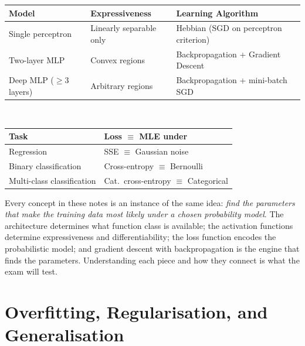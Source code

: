 \documentclass[11pt,a4paper]{article}
\begin{document}
\begin{tcolorbox}[colback=AlgoPurpleBg,colframe=AlgoPurple,boxrule=1pt,arc=4pt,
  title={\bfseries\color{white} ANN/DL Concepts Overview},
  attach boxed title to top left={yshift=-2mm,xshift=4mm},
  boxed title style={colback=AlgoPurple,rounded corners,boxrule=0pt}]
\begin{tabular}{@{}lll@{}}
\toprule
\textbf{Model} & \textbf{Expressiveness} & \textbf{Learning Algorithm} \\
\midrule
Single perceptron & Linearly separable only & Hebbian (SGD on perceptron criterion) \\
Two-layer MLP & Convex regions & Backpropagation + Gradient Descent \\
Deep MLP ($\geq 3$ layers) & Arbitrary regions & Backpropagation + mini-batch SGD \\
\bottomrule
\end{tabular}\\[8pt]
\begin{tabular}{@{}ll@{}}
\toprule
\textbf{Task} & \textbf{Loss $\equiv$ MLE under} \\
\midrule
Regression & SSE $\equiv$ Gaussian noise \\
Binary classification & Cross-entropy $\equiv$ Bernoulli \\
Multi-class classification & Cat.\ cross-entropy $\equiv$ Categorical \\
\bottomrule
\end{tabular}
\end{tcolorbox}

\begin{insightbox}
Every concept in these notes is an instance of the same idea: \emph{find the parameters that make the training data most likely under a chosen probability model}. The architecture determines what function class is available; the activation functions determine expressiveness and differentiability; the loss function encodes the probabilistic model; and gradient descent with backpropagation is the engine that finds the parameters. Understanding each piece and how they connect is what the exam will test.
\end{insightbox}



\section{Overfitting, Regularisation, and Generalisation}
\label{sec:regularisation}
\end{document}
